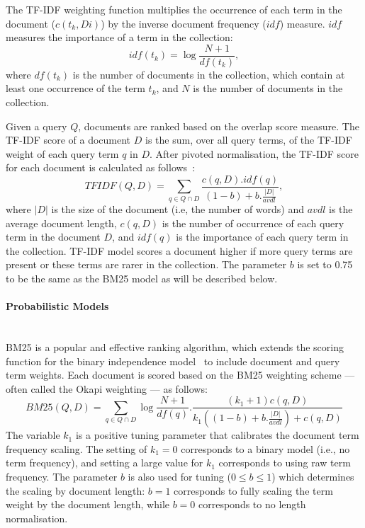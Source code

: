 The TF-IDF weighting function multiplies the occurrence of each term in the document ($ c(t_{k},Di)$)
by the inverse document frequency ($ idf $) measure. $ idf $ measures the importance of a term in the collection: 
\begin{equation}
idf(t_{k})=\log\frac{N+1}{df(t_{k})},
\label{eq:idf}
\end{equation}
where $ df(t_{k}) $ is the number of documents in the collection, which contain at least one occurrence of the term $ t_{k} $, and $ N $ is the number of documents in the collection. 

Given a query $Q$, documents are ranked based on the overlap score measure. The TF-IDF score of a document $D$ is the sum, over all query terms, of the TF-IDF weight of each query term $q$ in $D$. After pivoted normalisation, the TF-IDF score for each document is calculated as follows~\citep{bache2010improving}:
\begin{equation}
TFIDF(Q,D)=\sum\limits_{q \in Q\cap D}\frac{c(q,D).idf(q)}{(1-b)+b.\frac{|D|}{avdl}},
\label{eq:tfidf}
\end{equation}
where $ |D| $ is the size of the document (i.e, the number of words) and $ avdl $ is the average document length, $ c(q,D)$ is the number of occurrence of each query term in the document $D$, and $idf(q)$ is the importance of each query term in the collection. TF-IDF model scores a document higher if more query terms are present or these terms are rarer in the collection. The parameter $ b $ is set to 0.75 to be the same as the BM25 model as will be described below.
\paragraph{Probabilistic Models}
\ \\
BM25 is a popular and effective ranking algorithm, which extends the scoring function for the binary independence model~\citep{manning2008introduction} to include document and query term weights. Each document is scored based on the BM25 weighting scheme --- often called the Okapi weighting --- as follows:
\begin{equation}
BM25(Q,D)=\sum\limits_{q \in Q\cap D}\log\frac{N+1}{df(q)}.\frac{(k_{1}+1)c(q,D)}{k_{1}((1-b)+b.\frac{|D|}{avdl})+c(q,D)}
\label{eq:idfbm25}
\end{equation}
The variable $ k_{1} $ is a positive tuning parameter that calibrates the document term frequency scaling. The setting of $ k_{1}=0 $ corresponds to a binary model (i.e., no term frequency), and setting a large value for $ k_{1} $ corresponds to using raw term
frequency. The parameter $ b $ is also used for tuning ($ 0 \leq b \leq 1 $) which determines the scaling by document length: $ b = 1 $ corresponds to fully scaling the term weight by the document length, while $ b = 0 $ corresponds to no length normalisation. 

